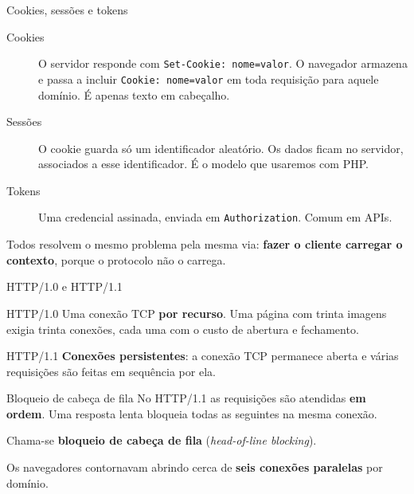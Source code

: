 \documentclass{beamer}
\begin{document}
\begin{frame}{Cookies, sessões e tokens}
  \begin{description}
    \item[Cookies] O servidor responde com \texttt{Set-Cookie: nome=valor}. O
      navegador armazena e passa a incluir \texttt{Cookie: nome=valor} em toda
      requisição para aquele domínio. É apenas texto em cabeçalho.

    \item[Sessões] O cookie guarda só um identificador aleatório. Os dados ficam
      no servidor, associados a esse identificador. É o modelo que usaremos com
      PHP.

    \item[Tokens] Uma credencial assinada, enviada em \texttt{Authorization}.
      Comum em APIs.
  \end{description}

  \vspace{0.4cm}
  Todos resolvem o mesmo problema pela mesma via: \textbf{fazer o cliente
  carregar o contexto}, porque o protocolo não o carrega.
\end{frame}


\begin{frame}{HTTP/1.0 e HTTP/1.1}
  \begin{block}{HTTP/1.0}
    Uma conexão TCP \textbf{por recurso}. Uma página com trinta imagens exigia
    trinta conexões, cada uma com o custo de abertura e fechamento.
  \end{block}

  \begin{block}{HTTP/1.1}
    \textbf{Conexões persistentes}: a conexão TCP permanece aberta e várias
    requisições são feitas em sequência por ela.
  \end{block}
\end{frame}

\begin{frame}{Bloqueio de cabeça de fila}
  No HTTP/1.1 as requisições são atendidas \textbf{em ordem}. Uma resposta lenta
  bloqueia todas as seguintes na mesma conexão.

  \vspace{0.4cm}
  Chama-se \textbf{bloqueio de cabeça de fila}
  (\textit{head-of-line blocking}).

  \vspace{0.4cm}
  Os navegadores contornavam abrindo cerca de \textbf{seis conexões paralelas}
  por domínio.
\end{frame}
\end{document}

